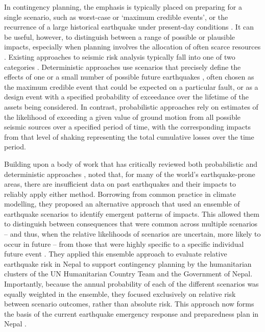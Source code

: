 \documentclass[nhess, manuscript]{copernicus}
\begin{document}
In contingency planning, the emphasis is typically placed on preparing for a single scenario, such as worst-case or `maximum credible events', or the recurrence of a large historical earthquake under present-day conditions \citep{klugel_seismic_2008}. It can be useful, however, to distinguish between a range of possible or plausible impacts, especially when planning involves the allocation of often scarce resources \citep{Robinson2018}. Existing approaches to seismic risk analysis typically fall into one of two categories \citep{Robinson2018, mcguire_deterministic_2001}. Deterministic approaches use scenarios that precisely define the effects of one or a small number of possible future earthquakes \citep{Davies2015}, often chosen as the maximum credible event that could be expected on a particular fault, or as a design event with a specified probability of exceedance over the lifetime of the assets being considered. In contrast, probabilistic approaches rely on estimates of the likelihood of exceeding a given value of ground motion from all possible seismic sources over a specified period of time, with the corresponding impacts from that level of shaking representing the total cumulative losses over the time period.

Building upon a body of work that has critically reviewed both probabilistic and deterministic approaches \citep{Bommer2002,Wang2003,Wang2011,Bilham2013, klugel_seismic_2008}, \citet{Robinson2018} noted that, for many of the world's earthquake-prone areas, there are insufficient data on past earthquakes and their impacts to reliably apply either method. Borrowing from common practice in climate modelling, they proposed an alternative approach that used an ensemble of earthquake scenarios to identify emergent patterns of impacts. This allowed them to distinguish between consequences that were common across multiple scenarios -- and thus, when the relative likelihoods of scenarios are uncertain,  more likely to occur in future -- from those that were highly specific to a specific individual future event \citep{Robinson2018}. They applied this ensemble approach to evaluate relative earthquake risk in Nepal to support contingency planning by the humanitarian clusters of the UN Humanitarian Country Team and the Government of Nepal. Importantly, because the annual probability of each of the different scenarios was equally weighted in the ensemble, they focused exclusively on relative risk between scenario outcomes, rather than absolute risk. This approach now forms the basis of the current earthquake emergency response and preparedness plan in Nepal \citep{un_nepal2022earthquake}.
\end{document}
